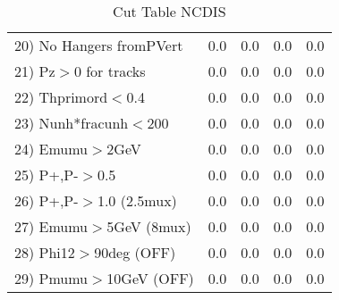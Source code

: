 \begin{table}[h!]
\begin{tabular}{||l||r|r|r|r||}
 20) No Hangers fromPVert &         0.0 &         0.0 &         0.0 &         0.0 \\
 21) Pz$>$0 for tracks    &         0.0 &         0.0 &         0.0 &         0.0 \\
 22) Thprimord$<$0.4      &         0.0 &         0.0 &         0.0 &         0.0 \\
 23) Nunh*fracunh$<$200   &         0.0 &         0.0 &         0.0 &         0.0 \\
 24) Emumu$>$2GeV         &         0.0 &         0.0 &         0.0 &         0.0 \\
 25) P+,P-$>$0.5          &         0.0 &         0.0 &         0.0 &         0.0 \\
 26) P+,P-$>$1.0 (2.5mux) &         0.0 &         0.0 &         0.0 &         0.0 \\
 27) Emumu$>$5GeV  (8mux) &         0.0 &         0.0 &         0.0 &         0.0 \\
 28) Phi12$>$90deg  (OFF) &         0.0 &         0.0 &         0.0 &         0.0 \\
 29) Pmumu$>$10GeV  (OFF) &         0.0 &         0.0 &         0.0 &         0.0 \\
 \hline
 \hline
 \end{tabular}
 \caption{Cut Table  NCDIS  }
 \label{tab-cut_ncdis}
 \end{table}
